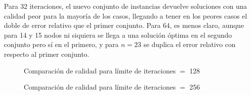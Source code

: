 Para 32 iteraciones, el nuevo conjunto de instancias devuelve soluciones con una calidad peor para la mayoría de los casos, llegando a tener en los peores casos el doble de error relativo que el primer conjunto. Para 64, es menos claro, aunque para 14 y 15 nodos ni siquiera se llega a una solución óptima en el segundo conjunto pero sí en el primero, y para $n = 23$ se duplica el error relativo con respecto al primer conjunto.

\begin{figure}[H]
	\begin{minipage}[t]{0.5\linewidth}
		\centering
		\caption{Comparación de calidad para límite de iteraciones $=$ 128}
		\label{fig:ejercicio-6-calidad-comparacion-n-128}
	\end{minipage}
	\begin{minipage}[t]{0.5\linewidth}
		\centering
		\caption{Comparación de calidad para límite de iteraciones $=$ 256}
		\label{fig:ejercicio-6-calidad-comparacion-n-256}
	\end{minipage}
\end{figure}

